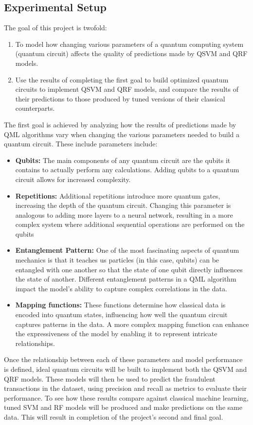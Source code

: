 \documentclass[11pt, oneside]{article}   	%
\begin{document}
\subsection{Experimental Setup}

\hspace{10mm}The goal of this project is twofold: 

\begin{enumerate}
    \item To model how changing various parameters of a quantum computing system (quantum circuit) affects the quality of predictions made by QSVM and QRF models.
    \item Use the results of completing the first goal to build optimized quantum circuits to implement QSVM and QRF models, and compare the results of their predictions to those produced by tuned versions of their classical counterparts.
\end{enumerate}

\noindent\hspace{10mm}The first goal is achieved by analyzing how the results of predictions made by QML algorithms vary when changing the various parameters needed to build a quantum circuit. These include parameters include:


\begin{itemize}
    \item \textbf{Qubits:} The main components of any quantum circuit are the qubits it contains to actually perform any calculations. Adding qubits to a quantum circuit allows for increased complexity.
    \item \textbf{Repetitions:} Additional repetitions introduce more quantum gates, increasing the depth of the quantum circuit. Changing this parameter is analogous to adding more layers to a neural network, resulting in a more complex system where additional sequential operations are performed on the qubits
    \item \textbf{Entanglement Pattern:} One of the most fascinating aspects of quantum mechanics is that it teaches us particles (in this case, qubits) can be entangled with one another so that the state of one qubit directly influences the state of another. Different entanglement patterns in a QML algorithm impact the model’s ability to capture complex correlations in the data.
    \item \textbf{Mapping functions:} These functions determine how classical data is encoded into quantum states, influencing how well the quantum circuit captures patterns in the data. A more complex mapping function can enhance the expressiveness of the model by enabling it to represent intricate relationships.
\end{itemize}

Once the relationship between each of these parameters and model performance is defined, ideal quantum circuits will be built to implement both the QSVM and QRF models. These models will then be used to predict the fraudulent transactions in the dataset, using precision and recall as metrics to evaluate their performance. To see how these results compare against classical machine learning, tuned SVM and RF models will be produced and make predictions on the same data. This will result in completion of the project's second and final goal. 
\end{document}
